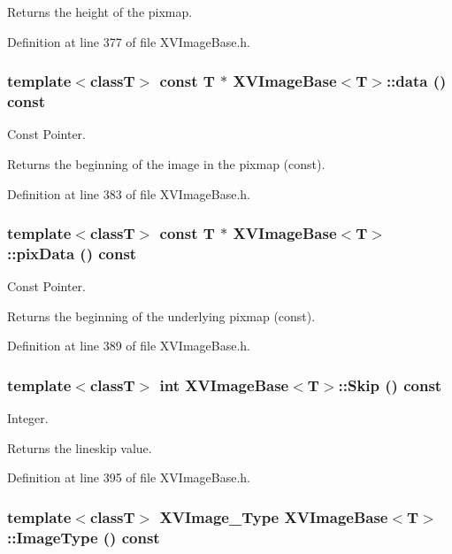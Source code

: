 Returns the height of the pixmap.



Definition at line 377 of file XVImage\-Base.h.\label{XVImageBase_a2}
\hypertarget{class_XVImageBase_a2}{
\subsubsection[data]{\setlength{\rightskip}{0pt plus 5cm}template$<$classT$>$ const T $\ast$ XVImage\-Base$<$T$>$::data () const}}


Const Pointer.

Returns the beginning of the image in the pixmap (const). 

Definition at line 383 of file XVImage\-Base.h.\label{XVImageBase_a3}
\hypertarget{class_XVImageBase_a3}{
\subsubsection[pixData]{\setlength{\rightskip}{0pt plus 5cm}template$<$classT$>$ const T $\ast$ XVImage\-Base$<$T$>$::pix\-Data () const}}


Const Pointer.

Returns the beginning of the underlying pixmap (const). 

Definition at line 389 of file XVImage\-Base.h.\label{XVImageBase_a4}
\hypertarget{class_XVImageBase_a4}{
\subsubsection[Skip]{\setlength{\rightskip}{0pt plus 5cm}template$<$classT$>$ int XVImage\-Base$<$T$>$::Skip () const}}


Integer.

Returns the lineskip value. 

Definition at line 395 of file XVImage\-Base.h.\label{XVImageBase_a5}
\hypertarget{class_XVImageBase_a5}{
\subsubsection[ImageType]{\setlength{\rightskip}{0pt plus 5cm}template$<$classT$>$ XVImage\_\-Type XVImage\-Base$<$T$>$::Image\-Type () const}}


